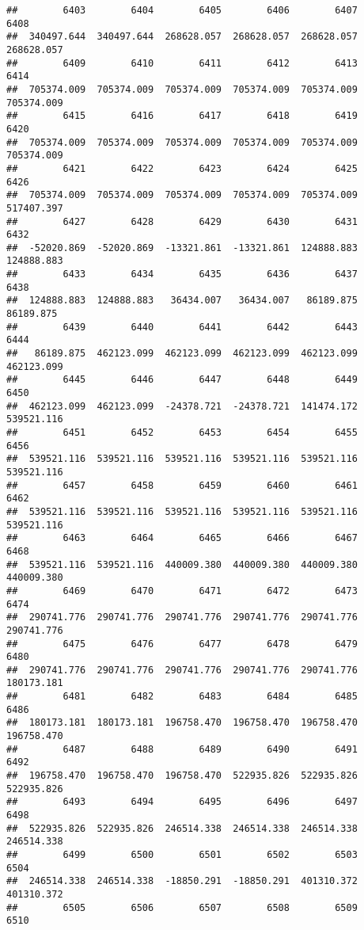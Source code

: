 \documentclass[
]{book}
\begin{document}
\begin{verbatim}
##        6403        6404        6405        6406        6407        6408 
##  340497.644  340497.644  268628.057  268628.057  268628.057  268628.057 
##        6409        6410        6411        6412        6413        6414 
##  705374.009  705374.009  705374.009  705374.009  705374.009  705374.009 
##        6415        6416        6417        6418        6419        6420 
##  705374.009  705374.009  705374.009  705374.009  705374.009  705374.009 
##        6421        6422        6423        6424        6425        6426 
##  705374.009  705374.009  705374.009  705374.009  705374.009  517407.397 
##        6427        6428        6429        6430        6431        6432 
##  -52020.869  -52020.869  -13321.861  -13321.861  124888.883  124888.883 
##        6433        6434        6435        6436        6437        6438 
##  124888.883  124888.883   36434.007   36434.007   86189.875   86189.875 
##        6439        6440        6441        6442        6443        6444 
##   86189.875  462123.099  462123.099  462123.099  462123.099  462123.099 
##        6445        6446        6447        6448        6449        6450 
##  462123.099  462123.099  -24378.721  -24378.721  141474.172  539521.116 
##        6451        6452        6453        6454        6455        6456 
##  539521.116  539521.116  539521.116  539521.116  539521.116  539521.116 
##        6457        6458        6459        6460        6461        6462 
##  539521.116  539521.116  539521.116  539521.116  539521.116  539521.116 
##        6463        6464        6465        6466        6467        6468 
##  539521.116  539521.116  440009.380  440009.380  440009.380  440009.380 
##        6469        6470        6471        6472        6473        6474 
##  290741.776  290741.776  290741.776  290741.776  290741.776  290741.776 
##        6475        6476        6477        6478        6479        6480 
##  290741.776  290741.776  290741.776  290741.776  290741.776  180173.181 
##        6481        6482        6483        6484        6485        6486 
##  180173.181  180173.181  196758.470  196758.470  196758.470  196758.470 
##        6487        6488        6489        6490        6491        6492 
##  196758.470  196758.470  196758.470  522935.826  522935.826  522935.826 
##        6493        6494        6495        6496        6497        6498 
##  522935.826  522935.826  246514.338  246514.338  246514.338  246514.338 
##        6499        6500        6501        6502        6503        6504 
##  246514.338  246514.338  -18850.291  -18850.291  401310.372  401310.372 
##        6505        6506        6507        6508        6509        6510 

\end{verbatim}
\end{document}
